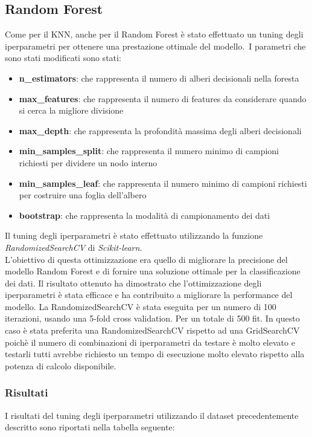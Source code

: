\documentclass[../../Report.tex]{subfiles}
\begin{document}
\subsection{Random Forest}
\label{sec:random_forest}
Come per il KNN, anche per il Random Forest è stato effettuato un tuning degli iperparametri per ottenere una prestazione ottimale del modello.\
I parametri che sono stati modificati sono stati:
\begin{itemize}
\item \textbf{n\_estimators}: che rappresenta il numero di alberi decisionali nella foresta
\item \textbf{max\_features}: che rappresenta il numero di features da considerare quando si cerca la migliore divisione
\item \textbf{max\_depth}: che rappresenta la profondità massima degli alberi decisionali
\item \textbf{min\_samples\_split}: che rappresenta il numero minimo di campioni richiesti per dividere un nodo interno
\item \textbf{min\_samples\_leaf}: che rappresenta il numero minimo di campioni richiesti per costruire una foglia dell'albero
\item \textbf{bootstrap}: che rappresenta la modalità di campionamento dei dati
\end{itemize}
Il tuning degli iperparametri è stato effettuato utilizzando la funzione \emph{RandomizedSearchCV} di \emph{Scikit-learn}.\\
L'obiettivo di questa ottimizzazione era quello di migliorare la precisione del modello Random Forest e di fornire una soluzione ottimale per la classificazione dei dati. Il risultato ottenuto ha dimostrato che l'ottimizzazione degli iperparametri è stata efficace e ha contribuito a migliorare la performance del modello. La RandomizedSearchCV è stata eseguita per un numero di 100 iterazioni, usando una 5-fold cross validation. Per un totale di 500 fit. In questo caso è stata preferita una RandomizedSearchCV rispetto ad una GridSearchCV poichè il numero di combinazioni di iperparametri da testare è molto elevato e testarli tutti avrebbe richiesto un tempo di esecuzione molto elevato rispetto alla potenza di calcolo disponibile. 

\subsubsection{Risultati}

I risultati del tuning degli iperparametri utilizzando il dataset precedentemente descritto sono riportati nella tabella seguente:
\end{document}
